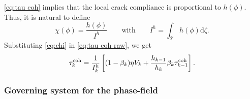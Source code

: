 \documentclass{article}
\begin{document}
\cref{eq:tau coh} implies that the local crack compliance is proportional to $h(\phi)$. Thus, it is natural to define
\begin{equation}\label{eq:chi}
  \chi(\phi) = \frac{h(\phi)}{I^h}\qquad\text{with}\qquad I^h = \int_{\mathcal T} h(\phi)\mathrm d\zeta.
\end{equation}
Substituting \eqref{eq:chi} in \eqref{eq:tau coh raw}, we get
\begin{equation}\label{eq:tau coh}
  \tau_k^{\rm coh} = \frac{1}{I^h_{k}}\left[(1-\beta_k)\eta V_k + \frac{h_{k-1}}{h_k}\beta_k\tau_{k-1}^{\rm coh}\right].
\end{equation}


\subsubsection{Governing system for the phase-field}\label{sect:phase-field}
\end{document}
